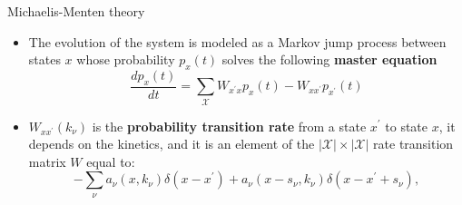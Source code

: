 \documentclass[final]{beamer}
\newlength{\colwidth}
\begin{document}
\begin{frame}[t]
\begin{columns}[t]
\begin{column}{\colwidth}
\begin{block}{Michaelis-Menten theory}
\begin{itemize}
\justifying
%
%
%
\item The evolution of the system is modeled as a Markov jump process between states $x$ whose probability $p_x(t)$ solves the following {\bf master equation}\cite{van2007stochastic,GILLESPIE1976403}
%
\begin{equation}
\frac{dp_{x}(t)}{dt} = \sum_{\mathcal{X}} W_{x^\prime x} p_{x}(t) -  W_{x x^\prime}p_{x^\prime}(t) \label{eq CME}
\end{equation}
\item $W_{x x^\prime }(k_\nu)$ is the {\bf probability transition rate} from a state $x^\prime$ to state $x$, it depends on the kinetics, and it is an element of the $|\mathcal{X}|\times|\mathcal{X}|$ rate transition matrix $W$ equal to\cite{Munsky_2006}:
\begin{equation*}
-\sum_\nu a_\nu({x},k_\nu) \delta(x - x^\prime) + a_\nu({x} - s_\nu,k_\nu) \delta(x - x^\prime + s_\nu),

\end{equation*}
\end{itemize}
\end{block}
\end{column}
\end{columns}
\end{frame}
\end{document}
